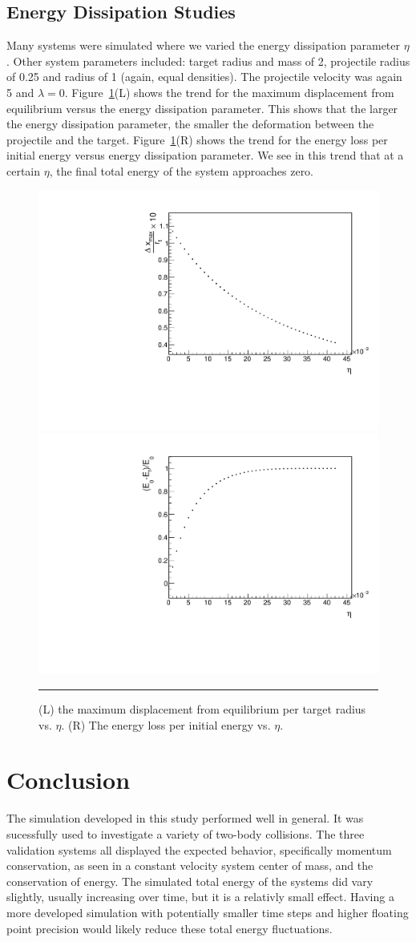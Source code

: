 \documentclass[aps,prl,floatfix,preprint,nofootinbib]{revtex4}
\begin{document}
\subsection{Energy Dissipation Studies}
Many systems were simulated where we varied the energy dissipation parameter $\eta$. Other system parameters included: target radius and mass of 2, projectile radius of 0.25 and radius of 1 (again, equal densities). The projectile velocity was again 5 and $\lambda = 0$. Figure~\ref{fig:changing_eta}(L) shows the trend for the maximum displacement from equilibrium versus the energy dissipation parameter. This shows that the larger the energy dissipation parameter, the smaller the deformation between the projectile and the target. Figure~\ref{fig:changing_eta}(R) shows the trend for the energy loss per initial energy versus energy dissipation parameter. We see in this trend that at a certain $\eta$, the final total energy of the system approaches zero.
\begin{figure}
  \includegraphics[width=.45\linewidth]{plots/trend_plots/dxmax_vs_eta.pdf}
  \includegraphics[width=.45\linewidth]{plots/trend_plots/Eloss_vs_eta.pdf}
                  {\par\nobreak\rule[9pt]{35em}{0.5pt}\vspace{-5mm}}
                  \caption{(L) the maximum displacement from equilibrium per target radius vs. $\eta$. (R) The energy loss per initial energy vs. $\eta$.}
                  \label{fig:changing_eta}
\end{figure}


\section{Conclusion}
The simulation developed in this study performed well in general. It was sucessfully used to investigate a variety of two-body collisions. The three validation systems all displayed the expected behavior, specifically momentum conservation, as seen in a constant velocity system center of mass, and the conservation of energy. The simulated total energy of the systems did vary slightly, usually increasing over time, but it is a relativly small effect. Having a more developed simulation with potentially smaller time steps and higher floating point precision would likely reduce these total energy fluctuations.
\end{document}
